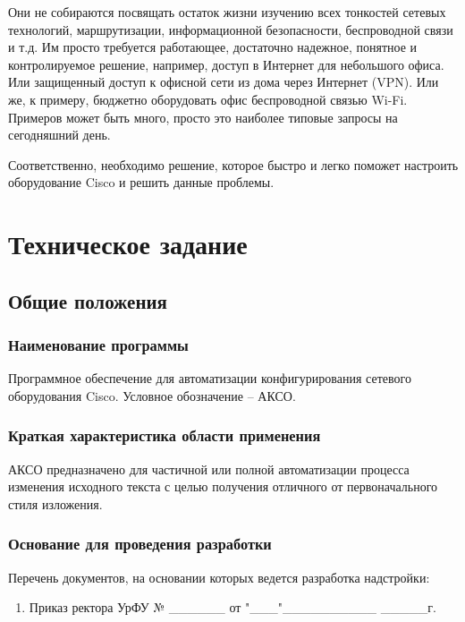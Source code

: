 \documentclass[a4paper,14pt]{extreport}
\begin{document}
	Они не собираются посвящать остаток жизни изучению всех тонкостей сетевых технологий, маршрутизации, информационной безопасности, беспроводной связи и т.д. Им просто требуется работающее, достаточно надежное, понятное и контролируемое решение, например, доступ в Интернет для небольшого офиса. Или защищенный доступ к офисной сети из дома через Интернет (VPN). Или же, к примеру, бюджетно оборудовать офис беспроводной связью Wi-Fi. Примеров может быть много, просто это наиболее типовые запросы на сегодняшний день.
	
	Соответственно, необходимо решение, которое быстро и легко поможет настроить оборудование Cisco и решить данные проблемы.
	
	\chapter{Техническое задание}
	
	\section{Общие положения}
	
	\subsection{Наименование программы}
	
	Программное обеспечение для автоматизации конфигурирования сетевого оборудования Cisco. Условное обозначение – АКСО\cite{gost-19.201-78}.
	
	\subsection{Краткая характеристика области применения}
	
	АКСО предназначено для частичной или полной автоматизации процесса изменения исходного текста с целью получения отличного от первоначального стиля изложения.
	
	\subsection{Основание для проведения разработки}
	Перечень документов, на основании которых ведется разработка надстройки:
	
	\begin{enumerate}
		\item Приказ ректора УрФУ № \_\_\_\_\_\_ от "\_\_\_"\_\_\_\_\_\_\_\_\_\_ \_\_\_\_\_г.
	\end{enumerate}
		
\end{document}
